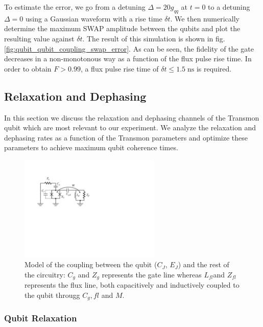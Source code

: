 To estimate the error, we go from a detuning $\Delta = 20 g_{qq}$ at $t=0$ to a detuning $\Delta=0$ using a Gaussian waveform with a rise time $\delta t$. We then numerically determine the maximum SWAP amplitude between the qubits and plot the resulting value against $\delta t$. The result of this simulation is shown in fig. \ref{fig:qubit_qubit_coupling_swap_error}. As can be seen, the fidelity of the gate decreases in a non-monotonous way as a function of the flux pulse rise time. In order to obtain $F>0.99$, a flux pulse rise time of $\delta t \le 1.5\;\mathrm{ns}$ is required.

\subsection{Relaxation and Dephasing}

In this section we discuss the relaxation and dephasing channels of the Transmon qubit which are most relevant to our experiment. We analyze the relaxation and dephasing rates as a function of the Transmon parameters and optimize these parameters to achieve maximum qubit coherence times.

\begin{figure}
	\centering
	\includegraphics[width=0.6\textwidth]{./material/figures/introduction/cooper_pair_box_decoherence}
	\caption[]{Model of the coupling between the qubit ($C_J$, $E_J$) and the rest of the circuitry: $C_g$ and $Z_g$ represents the gate line whereas $L_{fl}$and $Z_{fl}$ represents the flux line, both capacitively and inductively coupled to the qubit througg $C_g,fl$ and $M$.}
	\label{fig:cooper_pair_box_decoherence}
\end{figure}

\subsubsection{Qubit Relaxation}

